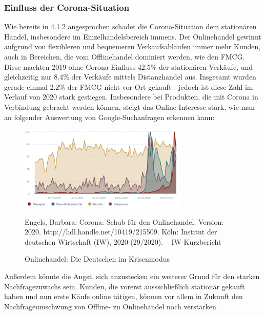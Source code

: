 \begin{folding} \subsubsection{Einfluss der Corona-Situation}
 
 Wie bereits in 4.1.2 angesprochen schadet die Corona-Situation dem stationären Handel, insbesondere im Einzelhandelsbereich immens. Der Onlinehandel gewinnt aufgrund von flexibleren und bequemeren Verkaufsabläufen immer mehr Kunden, auch in Bereichen, die vom Offlinehandel dominiert werden, wie den \ac{FMCG}. 
Diese machten 2019 ohne Corona-Einfluss 42.5\% der stationären Verkäufe, und gleichzeitig nur 8.4\% der Verkäufe mittels Distanzhandel aus. Insgesamt wurden gerade einmal 2.2\% der \ac{FMCG} nicht vor Ort gekauft - jedoch ist diese Zahl im Verlauf von 2020 stark gestiegen. Insbesondere bei Produkten, die mit Corona in Verbindung gebracht werden können, steigt das Online-Interesse stark, wie man an folgender Auswertung von Google-Suchanfragen erkennen kann:  

 \begin{figure}[h]
    \begin{center}
        \includegraphics[width=8cm]{media/Fabian-Corona-Produkte.png}
        \caption{Onlinehandel: Die Deutschen im Krisenmodus}
        \label{corona-produkte}
        \bildquelle  Engels, Barbara:   Corona: Schub für den Onlinehandel. Version: 2020. http://hdl.handle.net/10419/215509. Köln: Institut der deutschen Wirtschaft (IW), 2020 (29/2020). – IW-Kurzbericht
    \end{center}
\end{figure}
Außerdem könnte die Angst, sich anzustecken ein weiterer Grund für den starken Nachfragezuwachs sein. Kunden, die vorerst aussschließlich stationär gekauft haben und nun erste Käufe online tätigen, können vor allem in Zukunft den Nachfrageumschwung von Offline- zu Onlinehandel noch verstärken\cite{corona-schub}.



\end{folding}
